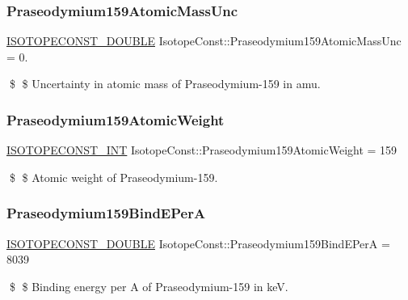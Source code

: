 \subsubsection{\texorpdfstring{Praseodymium159\+Atomic\+Mass\+Unc}{Praseodymium159AtomicMassUnc}}
{\footnotesize\ttfamily \mbox{\hyperlink{group___isotope_const-_macros_ga8f45a7272ce02c0b4c65c44636ed719a}{I\+S\+O\+T\+O\+P\+E\+C\+O\+N\+S\+T\+\_\+\+D\+O\+U\+B\+LE}} Isotope\+Const\+::\+Praseodymium159\+Atomic\+Mass\+Unc = 0.}

\$ \$ Uncertainty in atomic mass of Praseodymium-\/159 in amu. \mbox{\label{group___isotope_const-_praseodymium-_pr159_ga776cfc6a5a1688ac1ca62e75a3909ec0}} 
\subsubsection{\texorpdfstring{Praseodymium159\+Atomic\+Weight}{Praseodymium159AtomicWeight}}
{\footnotesize\ttfamily \mbox{\hyperlink{group___isotope_const-_macros_ga5f18360b3e99483a35c32d789e62621c}{I\+S\+O\+T\+O\+P\+E\+C\+O\+N\+S\+T\+\_\+\+I\+NT}} Isotope\+Const\+::\+Praseodymium159\+Atomic\+Weight = 159}

\$ \$ Atomic weight of Praseodymium-\/159. \mbox{\label{group___isotope_const-_praseodymium-_pr159_ga734ab91757b5443dbff693ca21d56ce5}} 
\subsubsection{\texorpdfstring{Praseodymium159\+Bind\+E\+PerA}{Praseodymium159BindEPerA}}
{\footnotesize\ttfamily \mbox{\hyperlink{group___isotope_const-_macros_ga8f45a7272ce02c0b4c65c44636ed719a}{I\+S\+O\+T\+O\+P\+E\+C\+O\+N\+S\+T\+\_\+\+D\+O\+U\+B\+LE}} Isotope\+Const\+::\+Praseodymium159\+Bind\+E\+PerA = 8039}

\$ \$ Binding energy per A of Praseodymium-\/159 in keV. \mbox{\label{group___isotope_const-_praseodymium-_pr159_ga4fa2d6150a78568e599cfd197d364b92}} 
